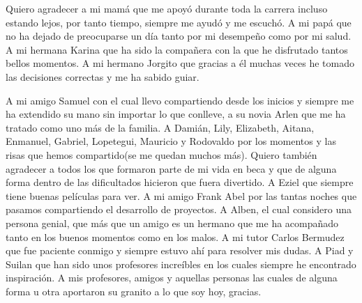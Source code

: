 \begin{acknowledgements}
Quiero agradecer a mi mamá que me apoyó durante toda la carrera incluso estando lejos, por tanto tiempo, siempre me ayudó y me escuchó. A mi papá que no ha dejado de preocuparse un día tanto por mi desempeño como por mi salud. A mi hermana Karina que ha sido la compañera con la que he disfrutado tantos bellos momentos. A mi hermano Jorgito que gracias a él muchas veces he tomado las decisiones correctas y me ha sabido guiar.

A mi amigo Samuel con el cual llevo compartiendo desde los inicios y siempre me ha extendido su mano sin importar lo que conlleve, a su novia Arlen que me ha tratado como uno más de la familia.
A Damián, Lily, Elizabeth, Aitana, Enmanuel, Gabriel, Lopetegui, Mauricio y Rodovaldo por los momentos y las risas que hemos compartido(se me quedan muchos más).
Quiero también agradecer a todos los que formaron parte de mi vida en beca y que de alguna forma dentro de las dificultados hicieron que fuera divertido.
A Eziel que siempre tiene buenas películas para ver.
A mi amigo Frank Abel por las tantas noches que pasamos compartiendo el desarrollo de proyectos.
A Alben, el cual considero una persona genial, que más que un amigo es un hermano que me ha acompañado tanto en los buenos momentos como en los malos.
A mi tutor Carlos Bermudez que fue paciente conmigo y siempre estuvo ahí para resolver mis dudas.
A Piad y Suilan que han sido unos profesores increíbles en los cuales siempre he encontrado inspiración.
A mis profesores, amigos y aquellas personas las cuales de alguna forma u otra aportaron su granito a lo que soy hoy, gracias.
\end{acknowledgements}